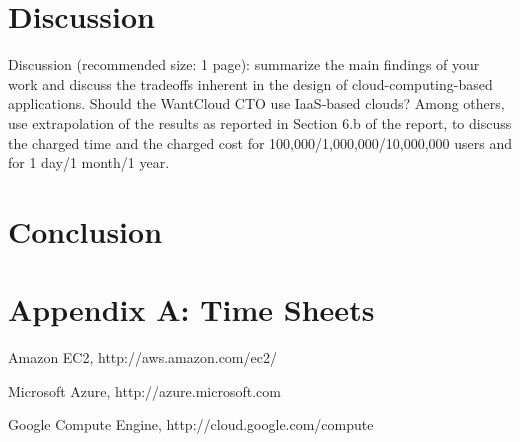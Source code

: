 \documentclass[twoside]{article}
\begin{document}
\begin{multicols}{2}

\section{Discussion}
Discussion (recommended size: 1 page): summarize the main findings of your work and discuss the tradeoffs inherent in the design of cloud-computing-based applications. Should the WantCloud CTO use IaaS-based clouds? Among others, use extrapolation of the results as reported in Section 6.b of the report, to discuss the charged time and the charged cost for 100,000/1,000,000/10,000,000 users and for 1 day/1 month/1 year.


\section{Conclusion}


\section{Appendix A: Time Sheets}


\begin{thebibliography}{99} %

Amazon EC2, http://aws.amazon.com/ec2/

Microsoft Azure, http://azure.microsoft.com

Google Compute Engine, http://cloud.google.com/compute

\end{thebibliography}


\end{multicols}
\end{document}
